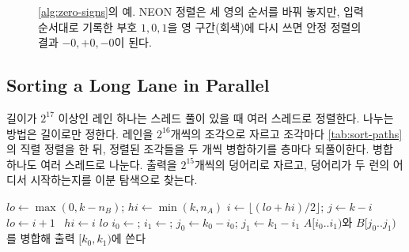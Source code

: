 \begin{figure}[htbp]
\centering
{}
\caption{\cref{alg:zero-signs}의 예. NEON 정렬은 세 영의 순서를 바꿔 놓지만, 입력 순서대로 기록한 부호 $1,0,1$을 영 구간(회색)에 다시 쓰면 안정 정렬의 결과 $-0,+0,-0$이 된다.}
\label{fig:zero-signs}
\end{figure}


\subsection{Sorting a Long Lane in Parallel}
\label{sec:long-lane}

길이가 $2^{17}$ 이상인 레인 하나는 스레드 풀이 있을 때 여러 스레드로 정렬한다. 나누는 방법은 길이로만 정한다. 레인을 $2^{16}$개씩의 조각으로 자르고 조각마다 \cref{tab:sort-paths}의 직렬 정렬을 한 뒤, 정렬된 조각들을 두 개씩 병합하기를 층마다 되풀이한다. 병합 하나도 여러 스레드로 나눈다. 출력을 $2^{15}$개씩의 덩어리로 자르고, 덩어리가 두 런의 어디서 시작하는지를 이분 탐색으로 찾는다.

\begin{algorithm}[htbp]
\begin{algorithmic}[1]
\Function{CoRank}{$k$, 런 $A[0..n_A)$, 런 $B[0..n_B)$}
  \State $\mathit{lo}\gets\max(0,k-n_B)$; $\mathit{hi}\gets\min(k,n_A)$
    \State $i\gets\lfloor(\mathit{lo}+\mathit{hi})/2\rfloor$; $j\gets k-i$
      \State $\mathit{lo}\gets i+1$ 
    \Else\ $\mathit{hi}\gets i$
    \EndIf
  \EndWhile
  \State \Return $\mathit{lo}$ 
\EndFunction
\ForAll{출력 덩어리 $[k_0,k_1)$ \textbf{in parallel}}
  \State $i_0\gets$; $i_1\gets$; $j_0\gets k_0-i_0$; $j_1\gets k_1-i_1$
  \State $A[i_0..i_1)$와 $B[j_0..j_1)$를 병합해 출력 $[k_0,k_1)$에 쓴다 
\EndFor
\end{algorithmic}
\caption{덩어리로 나눈 병합(merge path)}
\label{alg:merge-path}
\end{algorithm}


